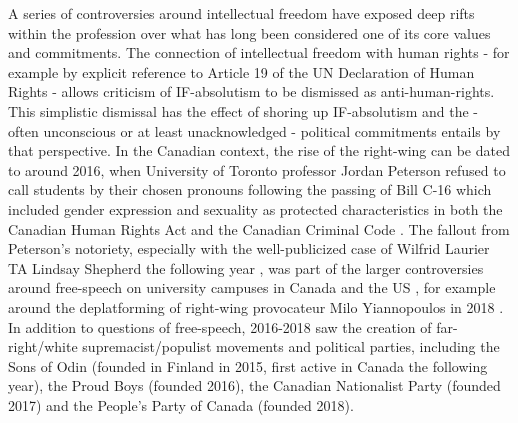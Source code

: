 \documentclass[12pt,oneside]{memoir}
\begin{document}
A series of controversies around intellectual freedom have exposed deep rifts within the profession over what has long been considered one of its core values and commitments. The connection of intellectual freedom with human rights - for example by explicit reference to Article 19 of the UN Declaration of Human Rights - allows criticism of IF-absolutism to be dismissed as anti-human-rights. This simplistic dismissal has the effect of shoring up IF-absolutism and the - often unconscious or at least unacknowledged - political commitments entails by that perspective. In the Canadian context, the rise of the right-wing can be dated to around 2016, when University of Toronto professor Jordan Peterson refused to call students by their chosen pronouns following the passing of Bill C-16 which included gender expression and sexuality as protected characteristics in both the Canadian Human Rights Act and the Canadian Criminal Code \cite{peterson-2016}. The fallout from Peterson's notoriety, especially with the well-publicized case of Wilfrid Laurier TA Lindsay Shepherd the following year \cite{hutchins-2017}, was part of the larger controversies around free-speech on university campuses in Canada and the US \cite{mackinnon-2018}, for example around the deplatforming of right-wing provocateur Milo Yiannopoulos in 2018 \cite{Beauchamp-2018}. In addition to questions of free-speech, 2016-2018 saw the creation of far-right/white supremacist/populist movements and political parties, including the Sons of Odin (founded in Finland in 2015, first active in Canada the following year), the Proud Boys (founded 2016), the Canadian Nationalist Party (founded 2017) and the People's Party of Canada (founded 2018). 
\end{document}
